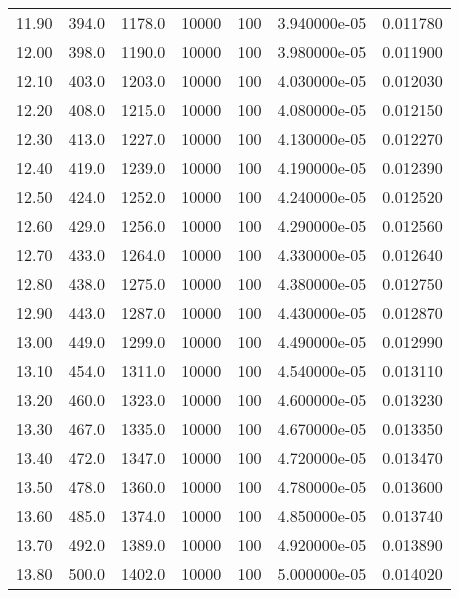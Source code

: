 \begin{tabular}{rrrrrrr}
   11.90 &     394.0 &    1178.0 & 10000 &  100 & 3.940000e-05 & 0.011780 \\
   12.00 &     398.0 &    1190.0 & 10000 &  100 & 3.980000e-05 & 0.011900 \\
   12.10 &     403.0 &    1203.0 & 10000 &  100 & 4.030000e-05 & 0.012030 \\
   12.20 &     408.0 &    1215.0 & 10000 &  100 & 4.080000e-05 & 0.012150 \\
   12.30 &     413.0 &    1227.0 & 10000 &  100 & 4.130000e-05 & 0.012270 \\
   12.40 &     419.0 &    1239.0 & 10000 &  100 & 4.190000e-05 & 0.012390 \\
   12.50 &     424.0 &    1252.0 & 10000 &  100 & 4.240000e-05 & 0.012520 \\
   12.60 &     429.0 &    1256.0 & 10000 &  100 & 4.290000e-05 & 0.012560 \\
   12.70 &     433.0 &    1264.0 & 10000 &  100 & 4.330000e-05 & 0.012640 \\
   12.80 &     438.0 &    1275.0 & 10000 &  100 & 4.380000e-05 & 0.012750 \\
   12.90 &     443.0 &    1287.0 & 10000 &  100 & 4.430000e-05 & 0.012870 \\
   13.00 &     449.0 &    1299.0 & 10000 &  100 & 4.490000e-05 & 0.012990 \\
   13.10 &     454.0 &    1311.0 & 10000 &  100 & 4.540000e-05 & 0.013110 \\
   13.20 &     460.0 &    1323.0 & 10000 &  100 & 4.600000e-05 & 0.013230 \\
   13.30 &     467.0 &    1335.0 & 10000 &  100 & 4.670000e-05 & 0.013350 \\
   13.40 &     472.0 &    1347.0 & 10000 &  100 & 4.720000e-05 & 0.013470 \\
   13.50 &     478.0 &    1360.0 & 10000 &  100 & 4.780000e-05 & 0.013600 \\
   13.60 &     485.0 &    1374.0 & 10000 &  100 & 4.850000e-05 & 0.013740 \\
   13.70 &     492.0 &    1389.0 & 10000 &  100 & 4.920000e-05 & 0.013890 \\
   13.80 &     500.0 &    1402.0 & 10000 &  100 & 5.000000e-05 & 0.014020 \\
\bottomrule
\end{tabular}
